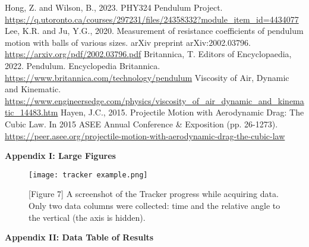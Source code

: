 \documentclass[11pt]{article}
\begin{document}
\pagebreak 

     \selectfont
    \begin{thebibliography}{} \selectfont
         Hong, Z. and Wilson, B., 2023. PHY324 Pendulum Project. \color{blue}\url{https://q.utoronto.ca/courses/297231/files/24358332?module_item_id=4434077} \color{black}
         Lee, K.R. and Ju, Y.G., 2020. Measurement of resistance coefficients of pendulum motion with balls of various sizes. arXiv preprint arXiv:2002.03796. \color{blue}\url{https://arxiv.org/pdf/2002.03796.pdf}\color{black}
         Britannica, T. Editors of Encyclopaedia, 2022. Pendulum. Encyclopedia Britannica. \color{blue}\url{https://www.britannica.com/technology/pendulum} \color{black}
         Viscosity of Air, Dynamic and Kinematic. \color{blue}\url{https://www.engineersedge.com/physics/viscosity_of_air_dynamic_and_kinematic_14483.htm} \color{black}
         Hayen, J.C., 2015. Projectile Motion with Aerodynamic Drag: The Cubic Law. In 2015 ASEE Annual Conference \& Exposition (pp. 26-1273). \color{blue} \url{https://peer.asee.org/projectile-motion-with-aerodynamic-drag-the-cubic-law}\color{black}
    \end{thebibliography}


    \vspace{20pt}

     \selectfont \textbf{Appendix I: Large Figures}
    
     \selectfont

    \begin{figure}[H]
        \centering
        \texttt{[image: tracker example.png]}
        \caption*{[Figure 7] A screenshot of the Tracker progress while acquiring data. Only two data columns were collected: time and the relative angle to the vertical (the axis is hidden).}
    \end{figure}

\pagebreak 

     \selectfont \textbf{Appendix II: Data Table of Results}

     \selectfont
\end{document}

